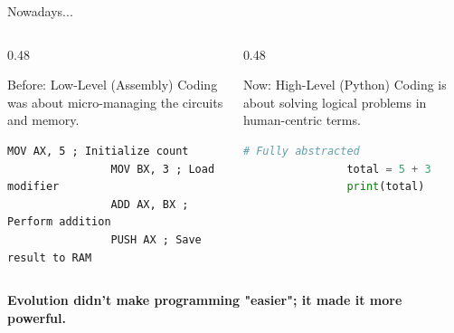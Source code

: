 \documentclass[aspectratio=169,11pt,english]{beamer}
\begin{document}
\begin{frame}[fragile]{Nowadays...} 
	\begin{columns}[T] 
		\begin{column}{0.48\textwidth} 
			\begin{block}{Before: Low-Level (Assembly)} 
				\small Coding was about micro-managing the circuits and memory. 
			\end{block} 
			\vspace{0.3em} 
			\begin{lstlisting}[language={[x86masm]Assembler},basicstyle=\ttfamily\footnotesize\color{black!80},keywordstyle=\color{blue!80!black}\bfseries,commentstyle=\color{gray}\itshape,numbers=none,frame=none]
				MOV AX, 5 ; Initialize count 
				MOV BX, 3 ; Load modifier 
				ADD AX, BX ; Perform addition 
				PUSH AX ; Save result to RAM 
			\end{lstlisting} 
			\vspace{0.5em} 
			{\footnotesize\color{red!80!black}{$\rightarrow$ Hard to write, easy to break.}} 
		\end{column} 
		
		\begin{column}{0.48\textwidth} 
			\begin{block}{Now: High-Level (Python)} 
				\small Coding is about solving logical problems in human-centric terms. 
			\end{block} 
			\vspace{0.3em} 
			\begin{lstlisting}[language=Python,basicstyle=\ttfamily\footnotesize\color{black!80},keywordstyle=\color{green!50!black}\bfseries,commentstyle=\color{gray}\itshape,numbers=none,frame=none]
				# Fully abstracted 
				total = 5 + 3 
			 	print(total) 
			 
			\end{lstlisting} 
			\vspace{0.5em} 
			{\footnotesize\color{green!60!black}{$\rightarrow$ Focus on logic, not hardware.}} 
		\end{column} 
	\end{columns} 
	
	\vspace{1.5em} 
	\centering \textbf{Evolution didn't make programming "easier"; it made it more powerful.} 
\end{frame}
\end{document}
